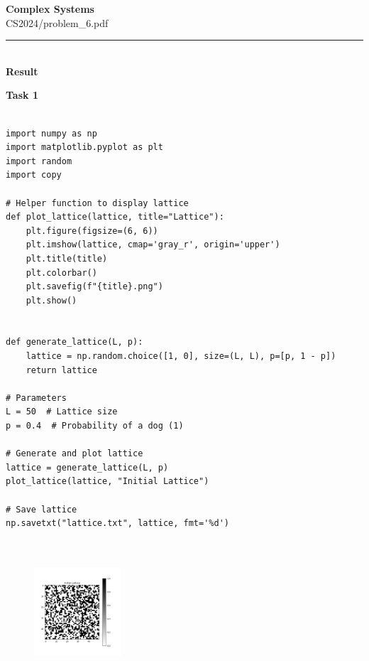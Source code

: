 \documentclass[10pt,letterpaper, onecolumn]{report}
\begin{document}
\begingroup
    \centering
    \LARGE \textbf{Complex Systems} \\
    \large CS2024/problem\_6.pdf \\[0.5em]
\endgroup

\begin{flushleft}
    \rule{\textwidth}{0.4pt} \\ %
    \textbf{Result}
\end{flushleft}

\begin{flushleft}
    \begin{flushleft}
        \textbf{Task 1}
        \hfill\break
        \setlength{\parindent}{1.5em} %
        \setlength{\parskip}{0.5em}   %


        \begin{lstlisting}[style=myPythonStyle, caption={Plot of the lattice LxL}]

import numpy as np
import matplotlib.pyplot as plt
import random
import copy

# Helper function to display lattice
def plot_lattice(lattice, title="Lattice"):
    plt.figure(figsize=(6, 6))
    plt.imshow(lattice, cmap='gray_r', origin='upper')
    plt.title(title)
    plt.colorbar()
    plt.savefig(f"{title}.png")
    plt.show()


def generate_lattice(L, p):
    lattice = np.random.choice([1, 0], size=(L, L), p=[p, 1 - p])
    return lattice

# Parameters
L = 50  # Lattice size
p = 0.4  # Probability of a dog (1)

# Generate and plot lattice
lattice = generate_lattice(L, p)
plot_lattice(lattice, "Initial Lattice")

# Save lattice
np.savetxt("lattice.txt", lattice, fmt='%d')



        \end{lstlisting}

        \begin{figure}[htbp!] %
            \centering
            \includegraphics[width=0.29\textwidth]{../Initial Lattice.png} %
        \end{figure}

    \end{flushleft}

\end{flushleft}
\end{document}
